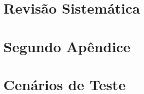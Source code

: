\begin{apendicesenv}

\partapendices

\chapter{Revisão Sistemática}
\label{sec:revisão_sistemática}



\chapter{Segundo Apêndice}
\label{sec:desenvolvimento_prático}



\chapter{Cenários de Teste}
\label{sec:dados_cenarios_teste}



\end{apendicesenv}
